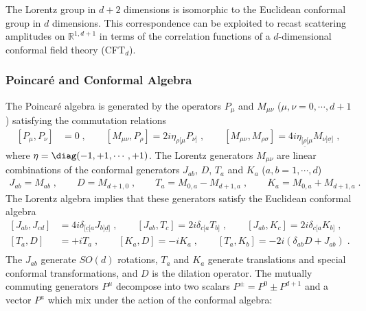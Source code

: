 \documentclass[11pt]{article}
\def\d{{\delta}}
\def\s{{\sigma}}
\begin{document}
The Lorentz group in $d+2$ dimensions is isomorphic to the Euclidean conformal group in $d$ dimensions. This correspondence can be exploited to recast scattering amplitudes on $\mathbb{R}^{1,d+1}$ in terms of the correlation functions of a $d$-dimensional conformal field theory (CFT$_d$).

\subsubsection*{Poincar\'e and Conformal Algebra}
The Poincar\'e algebra is generated by the operators $P_\mu$ and $M_{\mu\nu}$  ($\mu,\nu=0,\cdots,d+1$) satisfying the commutation relations
\begin{equation}
\begin{split}\label{poincarealgebra}
[ P_\mu , P_\nu ] &= 0 \;, \qquad [ M_{\mu\nu} , P_\rho ] = 2 i \eta_{\rho[\mu} P_{\nu]} \;, \qquad [ M_{\mu\nu} , M_{\rho\s} ] = 4 i  \eta_{[\underline\rho[\mu} M_{\nu]\underline\s]} \; ,  
\end{split}
\end{equation}
where $\eta=\diag(-1,+1,\cdots,+1)$. The Lorentz generators $M_{\mu\nu}$ are linear combinations of the conformal generators $J_{ab}$, $D$, $T_a$ and $K_a$ ($a,b=1,\cdots,d$)
\begin{equation}
\begin{split}\label{confgen}
J_{ab} = M_{ab} \;, \qquad D = M_{d+1,0}  \;, \qquad T_a = M_{0,a} - M_{d+1,a} \;, \qquad K_a = M_{0,a} + M_{d+1,a}  \; . 
\end{split} 
\end{equation}
The Lorentz algebra implies that these generators satisfy the Euclidean conformal algebra
\begin{equation}
\begin{split}\label{confalgebra}
[  J_{ab} ,  J_{cd} ] &= 4 i \d_{[\underline c[a}  J_{b]\underline d]}  \;, \qquad [ J_{ab} ,  T_c ] = 2 i \d_{c[a}  T_{b]}  \;, \qquad [ J_{ab} ,  K_c ] = 2 i \d_{c[a}  K_{b]}  \;, \\
[ T_a , D  ] &= + i  T_a \;, \qquad [ K_a , D  ] = - i  K_a   \;, \qquad [ T_a ,  K_b ] = - 2 i ( \d_{ab}  D +  J_{ab} ) \;. \\
\end{split}
\end{equation}
The $J_{ab}$ generate $SO(d)$ rotations, $T_a$ and $K_a$ generate translations and special conformal transformations, and $D$ is the dilation operator. The mutually commuting generators $P^\mu$ decompose into two scalars $P^{\pm}=P^0 \pm P^{d+1}$ and a vector $P^a$ which mix under the action of the conformal algebra:
\end{document}
